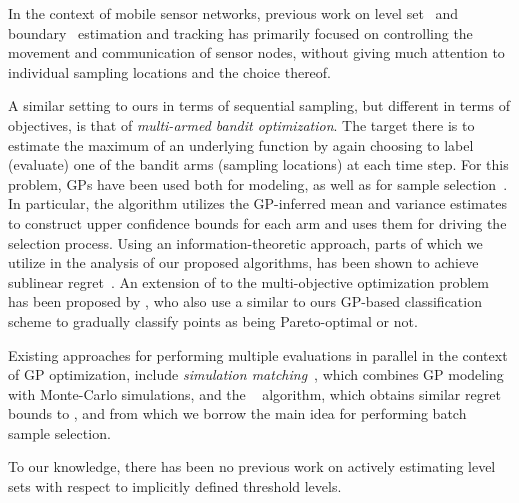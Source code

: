 In the context of mobile sensor networks, previous work on level
set~\cite{dantu07,srinivasan08} and boundary~\cite{singh06} estimation and
tracking has primarily focused on controlling the movement and
communication of sensor nodes, without giving much attention to
individual sampling locations and the choice thereof.

A similar setting to ours in terms of sequential sampling, but different
in terms of objectives, is that of \emph{multi-armed bandit optimization}.
The target there is to estimate the maximum of an underlying function
by again choosing to label (evaluate) one of the bandit arms (sampling
locations) at each time step. For this problem,
GPs have been used both for modeling, as well as for sample
selection~\mbox{\cite{brochu10}}. In particular, the \gpucb algorithm
utilizes the GP-inferred mean and variance estimates to construct upper
confidence bounds for each arm and uses them for driving the selection
process. Using an information-theoretic approach, parts of which we utilize
in the analysis of our proposed algorithms, \gpucb has been shown
to achieve sublinear regret~\cite{srinivas10}.
An extension of \gpucb to the multi-objective optimization problem has
been proposed by \citet{zuluaga13}, who also use a similar to ours GP-based
classification scheme to gradually classify points as being
Pareto-optimal or not.

Existing approaches for performing multiple evaluations in
parallel in the context of GP optimization, include
\emph{simulation matching}~\cite{azimi10}, which combines GP modeling with
Monte-Carlo simulations, and the \gpbucb~\cite{desautels12} algorithm,
which obtains similar regret bounds to \gpucb, and from which we borrow
the main idea for performing batch sample selection.

To our knowledge, there has been no previous work on actively estimating
level sets with respect to implicitly defined threshold levels.